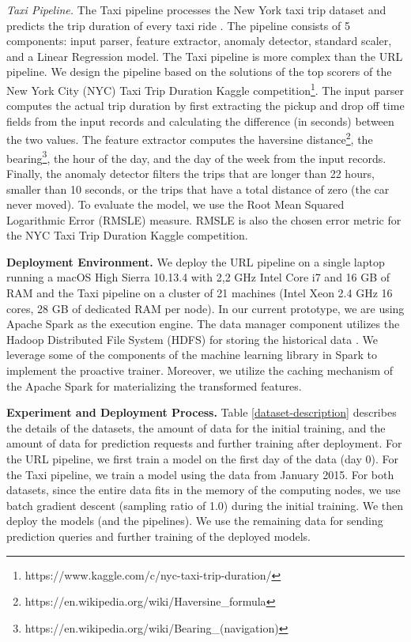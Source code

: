 \textit{Taxi Pipeline.} The Taxi pipeline processes the New York taxi trip dataset and predicts the trip duration of every taxi ride \cite{newyork-taxi}. 
The pipeline consists of 5 components: input parser, feature extractor, anomaly detector, standard scaler, and a Linear Regression model.
The Taxi pipeline is more complex than the URL pipeline. 
We design the pipeline based on the solutions of the top scorers of the New York City (NYC) Taxi Trip Duration Kaggle competition\footnote{https://www.kaggle.com/c/nyc-taxi-trip-duration/}. 
The input parser computes the actual trip duration by first extracting the pickup and drop off time fields from the input records and calculating the difference (in seconds) between the two values.
The feature extractor computes the haversine distance\footnote{https://en.wikipedia.org/wiki/Haversine\_formula}, the bearing\footnote{https://en.wikipedia.org/wiki/Bearing\_(navigation)}, the hour of the day, and the day of the week from the input records. 
Finally, the anomaly detector filters the trips that are longer than 22 hours, smaller than 10 seconds, or the trips that have a total distance of zero (the car never moved).
To evaluate the model, we use the Root Mean Squared Logarithmic Error (RMSLE) measure.
RMSLE is also the chosen error metric for the NYC Taxi Trip Duration Kaggle competition.

\textbf{Deployment Environment. }
We deploy the URL pipeline on a single laptop running a macOS High Sierra 10.13.4 with 2,2 GHz Intel Core i7 and 16 GB of RAM and the Taxi pipeline on a cluster of 21 machines (Intel Xeon 2.4 GHz 16 cores, 28 GB of dedicated RAM per node).
In our current prototype, we are using Apache Spark as the execution engine.
The data manager component utilizes the Hadoop Distributed File System (HDFS) for storing the historical data \cite{shvachko2010hadoop}.
We leverage some of the components of the machine learning library in Spark to implement the proactive trainer.
Moreover, we utilize the caching mechanism of the Apache Spark for materializing the transformed features.


\textbf{Experiment and Deployment Process. }
Table \ref{dataset-description} describes the details of the datasets, the amount of data for the initial training, and the amount of data for prediction requests and further training after deployment. 
For the URL pipeline, we first train a model on the first day of the data (day 0).
For the Taxi pipeline, we train a model using the data from January 2015.
For both datasets, since the entire data fits in the memory of the computing nodes, we use batch gradient descent (sampling ratio of 1.0) during the initial training.
We then deploy the models (and the pipelines).
We use the remaining data for sending prediction queries and further training of the deployed models.

